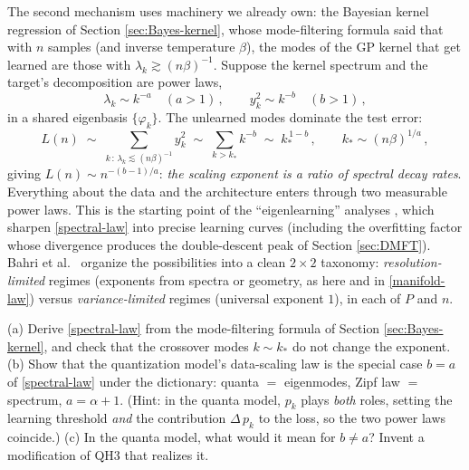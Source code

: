 \documentclass[11pt]{article}
\begin{document}
The second mechanism uses machinery we already own: the Bayesian kernel regression of Section \ref{sec:Bayes-kernel}, whose mode-filtering formula said that with $n$ samples (and inverse temperature $\beta$), the modes of the GP kernel that get learned are those with $\lambda_k \gtrsim (n\beta)^{-1}$. Suppose the kernel spectrum and the target's decomposition are power laws,
%
\begin{equation}
    \lambda_k \sim k^{-a}\quad (a>1)\,,\qquad y_k^2 \sim k^{-b}\quad (b>1)\,,
\end{equation}
%
in a shared eigenbasis $\{\varphi_k\}$. The unlearned modes dominate the test error:
%
\begin{equation} \label{spectral-law}
    L(n) \;\sim\; \sum_{k \,:\, \lambda_k \lesssim (n\beta)^{-1}} y_k^2
    \;\sim\; \sum_{k > k_*} k^{-b}
    \;\sim\; k_*^{\,1-b}\,,\qquad k_* \sim (n\beta)^{1/a}\,,
\end{equation}
%
giving $L(n) \sim n^{-(b-1)/a}$: \emph{the scaling exponent is a ratio of spectral decay rates}. Everything about the data and the architecture enters through two measurable power laws. This is the starting point of the ``eigenlearning'' analyses \cite{bordelon2020spectrum,canatar2021spectral,simon2023eigenlearning}, which sharpen \eqref{spectral-law} into precise learning curves (including the overfitting factor whose divergence produces the double-descent peak of Section \ref{sec:DMFT}). Bahri et al.\ \cite{bahri2021explaining} organize the possibilities into a clean $2\times2$ taxonomy: \emph{resolution-limited} regimes (exponents from spectra or geometry, as here and in \eqref{manifold-law}) versus \emph{variance-limited} regimes (universal exponent $1$), in each of $P$ and $n$.

\begin{exercise}
\label{ex:spectra}
(a) Derive \eqref{spectral-law} from the mode-filtering formula of Section \ref{sec:Bayes-kernel}, and check that the crossover modes $k\sim k_*$ do not change the exponent.
(b) Show that the quantization model's data-scaling law is the special case $b=a$ of \eqref{spectral-law} under the dictionary: quanta $=$ eigenmodes, Zipf law $=$ spectrum, $a = \alpha+1$. (Hint: in the quanta model, $p_k$ plays \emph{both} roles, setting the learning threshold \emph{and} the contribution $\Delta\,p_k$ to the loss, so the two power laws coincide.)
(c) In the quanta model, what would it mean for $b \neq a$? Invent a modification of QH3 that realizes it.
\end{exercise}
\end{document}
